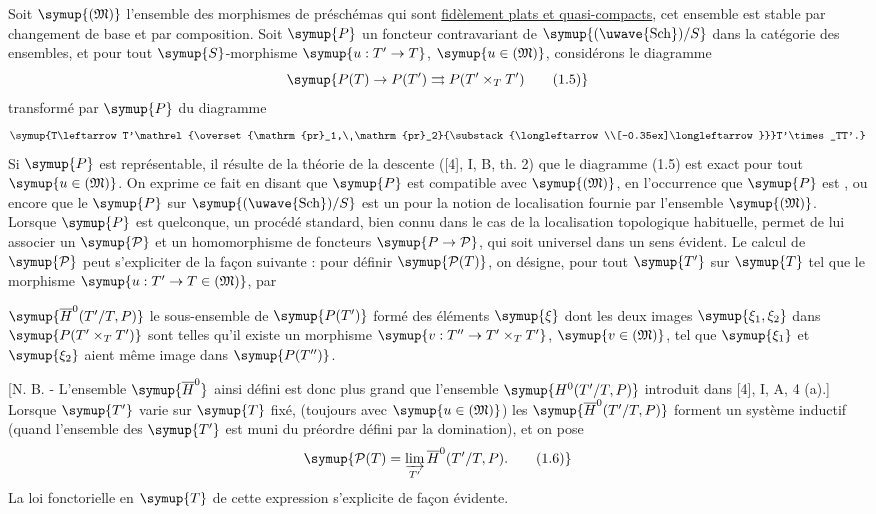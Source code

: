 Soit $\symup{(\mathfrak M)}$ l'ensemble des morphismes de préschémas qui sont
\uline{fidèlement plats et quasi-compacts}, cet ensemble est stable par
changement de base et par composition. Soit $\symup{P}$ un foncteur contravariant de
$\symup{(\text{\uwave{Sch}})/S}$ dans la catégorie des ensembles, et pour tout
$\symup{S}$-morphisme $\symup{u:T'\to T}$, $\symup{u\in(\mathfrak M)}$, considérons le
diagramme
\begin{equation}
\symup{P(T)\to P(T')\rightrightarrows P(T'\times_TT')
\tag{1.5}}
\end{equation}
transformé par $\symup{P}$ du diagramme
\[
\symup{T\leftarrow T'\mathrel{\overset{\mathrm{pr}_1,\ \mathrm{pr}_2}{\substack{\longleftarrow\\[-0.35ex]\longleftarrow}}}T'\times_TT'.}
\]
Si $\symup{P}$ est représentable, il résulte de la théorie de la descente ([4], I, B,
th. 2) que le diagramme (1.5) est exact pour tout $\symup{u\in(\mathfrak M)}$. On exprime
ce fait en disant que $\symup{P}$ est compatible avec $\symup{(\mathfrak M)}$, en l'occurrence
que $\symup{P}$ est , ou encore que le
 $\symup{P}$ sur $\symup{(\text{\uwave{Sch}})/S}$ est un  pour la notion
de localisation fournie par l'ensemble $\symup{(\mathfrak M)}$. Lorsque $\symup{P}$ est
quelconque, un procédé standard, bien connu dans le cas de la localisation
topologique habituelle, permet de lui associer un  $\symup{\mathcal P}$ et
un homomorphisme de foncteurs $\symup{P\to\mathcal P}$, qui soit universel
dans un sens évident. Le calcul de $\symup{\mathcal P}$ peut s'expliciter de la façon
suivante : pour définir $\symup{\mathcal P(T)}$, on désigne, pour tout $\symup{T'}$ sur $\symup{T}$ tel
que le morphisme $\symup{u:T'\to T\in(\mathfrak M)}$, par

$\symup{\overline H^0(T'/T,P)}$ le sous-ensemble de $\symup{P(T')}$ formé des éléments $\symup{\xi}$
dont les deux images $\symup{\xi_1,\xi_2}$ dans $\symup{P(T'\times_TT')}$ sont telles qu'il
existe un morphisme $\symup{v:T''\to T'\times_TT'}$, $\symup{v\in(\mathfrak M)}$,
tel que $\symup{\xi_1}$ et $\symup{\xi_2}$ aient même image dans $\symup{P(T'')}$.

[N. B. - L'ensemble
$\symup{\overline H^0}$ ainsi défini est donc plus grand que l'ensemble
$\symup{H^0(T'/T,P)}$ introduit dans [4], I, A, 4 (a).] Lorsque $\symup{T'}$ varie sur $\symup{T}$ fixé,
(toujours avec $\symup{u\in(\mathfrak M)}$) les $\symup{\overline H^0(T'/T,P)}$ forment un
système inductif (quand l'ensemble des $\symup{T'}$ est muni du préordre défini par la
domination), et on pose
\begin{equation}
\symup{\mathcal P(T)=\varinjlim\limits_{T'}\overline H^0(T'/T,P).
\tag{1.6}}
\end{equation}
La loi fonctorielle en $\symup{T}$ de cette expression s'explicite de façon évidente.

